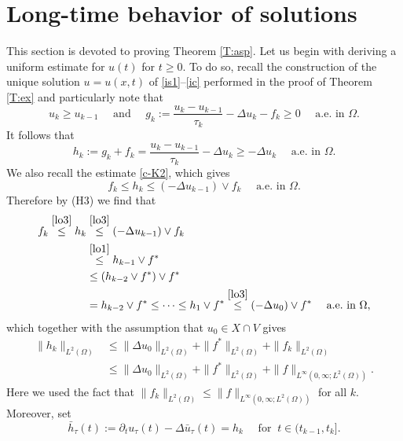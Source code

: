 \documentclass[reqno,10pt]{amsart}
\begin{document}
\section{Long-time behavior of solutions}
\label{sec-ab} 

This section is devoted to proving Theorem \ref{T:asp}.
Let us begin with deriving a uniform estimate for $u(t)$ for $t \geq 0$.
 To do so, recall the construction of the unique solution $u = u(x,t)$ of
 \eqref{is1}--\eqref{ic} performed in the proof of Theorem \ref{T:ex}
 and particularly note that 
 \begin{equation}\label{recall}
  u_k \geq u_{k-1} \quad \mbox{ and } \quad g_k := \dfrac{u_k -
   u_{k-1}}{\tau_k} - \Delta u_k - f_k \geq 0
   \quad \mbox{ a.e.~in } \Omega.
 \end{equation}
It follows that
\begin{equation}\label{lo1}
h_k := g_k + f_k = \dfrac{u_k - u_{k-1}}{\tau_k} - \Delta u_k
\geq - \Delta u_k \quad \mbox{ a.e.~in } \Omega.
\end{equation}
We also recall the estimate \eqref{c-K2}, which gives
\begin{equation}\label{lo3}
f_k \leq h_k \leq (- \Delta u_{k-1}) \vee f_k
\quad \mbox{ a.e.~in } \Omega.
\end{equation}
Therefore by (H3) we find that
\begin{align*}
f_k \stackrel{\eqref{lo3}}\leq h_k 
 &\stackrel{\eqref{lo3}}{\leq} \left(-\Delta u_{k-1}\right) \vee f_k\\
 &\stackrel{\eqref{lo1}}{\leq} h_{k-1} \vee f^*\\
 &\leq (h_{k-2} \vee f^*) \vee f^*\\
 &= h_{k-2} \vee f^* 
 \leq \cdots \leq  h_1 \vee f^*
 \stackrel{\eqref{lo3}}\leq \left(-\Delta u_0\right) \vee f^*
\quad \mbox{ a.e.~in } \Omega,
\end{align*}
which together with the assumption that $u_0 \in X \cap V$ gives
\begin{align}
\|h_k\|_{L^2(\Omega)} 
&\leq \|\Delta u_0\|_{L^2(\Omega)} + \|f^*\|_{L^2(\Omega)} +
 \|f_k\|_{L^2(\Omega)}\nonumber\\
&\leq \|\Delta u_0\|_{L^2(\Omega)} + \|f^*\|_{L^2(\Omega)} +
 \|f\|_{L^\infty(0,\infty;L^2(\Omega))}.\label{1}
\end{align}
Here we used the fact that $\|f_k\|_{L^2(\Omega)} \leq
\|f\|_{L^\infty(0,\infty;L^2(\Omega))}$ for all $k$.
Moreover, set 
$$
\bar h_\tau (t) := \partial_t u_\tau(t) - \Delta \bar u_\tau(t)
 = h_k \quad \mbox{ for } \ t \in (t_{k-1},t_k].
$$
\end{document}
